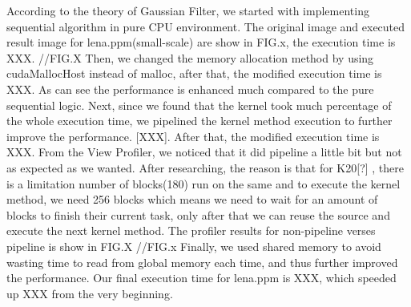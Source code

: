 \documentclass[journal,11pt,onecolumn,draftclsnofoot]{ieeeconf}  %
\begin{document}
According to the theory of Gaussian Filter, we started with implementing sequential algorithm in pure CPU environment. The original image and executed result image for lena.ppm(small-scale) are show in FIG.x, the execution time is XXX.
//FIG.X
Then, we changed the memory allocation method by using cudaMallocHost instead of malloc, after that, the modified execution time is XXX. As can see the performance is enhanced much compared to the pure sequential logic.
Next, since we found that the kernel took much percentage of the whole execution time, we pipelined the kernel method execution to further improve the performance. [XXX]. After that, the modified execution time is XXX. From the View Profiler, we noticed that it did pipeline a little bit but not as expected as we wanted. After researching, the reason is that for K20[?] , there is a limitation number of blocks(180) run on the same and to execute the kernel method, we need 256 blocks which means we need to wait for an amount of blocks to finish their current task, only after that we can reuse the source and execute the next kernel method. The profiler results for non-pipeline verses pipeline is show in FIG.X
//FIG.x
Finally, we used shared memory to avoid wasting time to read from global memory each time, and thus further improved the performance. Our final execution time for lena.ppm is XXX, which speeded up XXX from the very beginning.

\clearpage
\appendix
\end{document}
